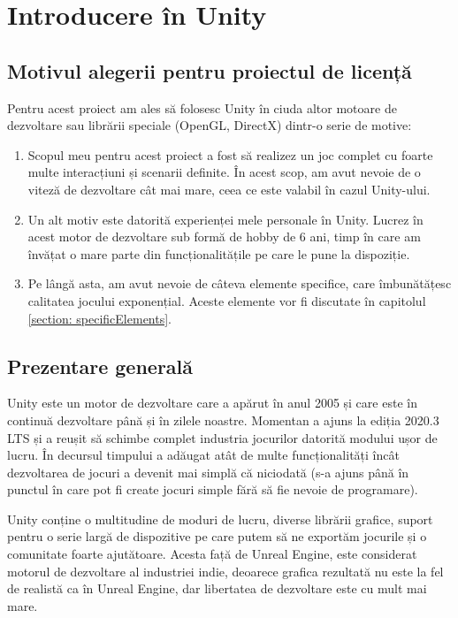 \documentclass[12pt, a4paper]{article}
\begin{document}
	
	\section{Introducere în Unity}
	
	\subsection{Motivul alegerii pentru proiectul de licență}
	
	Pentru acest proiect am ales să folosesc Unity în ciuda altor motoare de dezvoltare sau librării speciale (OpenGL, DirectX) dintr-o serie de motive:
	
	\begin{enumerate}
		\item Scopul meu pentru acest proiect a fost să realizez un joc complet cu foarte multe interacțiuni și scenarii definite. În acest scop, am avut nevoie de o viteză de dezvoltare cât mai mare, ceea ce este valabil în cazul Unity-ului.
		\item Un alt motiv este datorită experienței mele personale în Unity. Lucrez în acest motor de dezvoltare sub formă de hobby de 6 ani, timp în care am învățat o mare parte din funcționalitățile pe care le pune la dispoziție.
		\item Pe lângă asta, am avut nevoie de câteva elemente specifice, care îmbunătățesc calitatea jocului exponențial. Aceste elemente vor fi discutate în capitolul \ref{section: specificElements}.
	\end{enumerate}
	
	
	
	
	
	\subsection{Prezentare generală}
	
	Unity este un motor de dezvoltare care a apărut în anul 2005 și care este în continuă dezvoltare până și în zilele noastre. Momentan a ajuns la ediția 2020.3 LTS și a reușit să schimbe complet industria jocurilor datorită modului ușor de lucru. În decursul timpului a adăugat atât de multe funcționalități încât dezvoltarea de jocuri a devenit mai simplă că niciodată (s-a ajuns până în punctul în care pot fi create jocuri simple fără să fie nevoie de programare).
	\newline
	
	Unity conține o multitudine de moduri de lucru, diverse librării grafice, suport pentru o serie largă de dispozitive pe care putem să ne exportăm jocurile și o comunitate foarte ajutătoare. Acesta față de Unreal Engine, este considerat motorul de dezvoltare al industriei indie, deoarece grafica rezultată nu este la fel de realistă ca în Unreal Engine, dar libertatea de dezvoltare este cu mult mai mare.
	\newline
	
\end{document}
